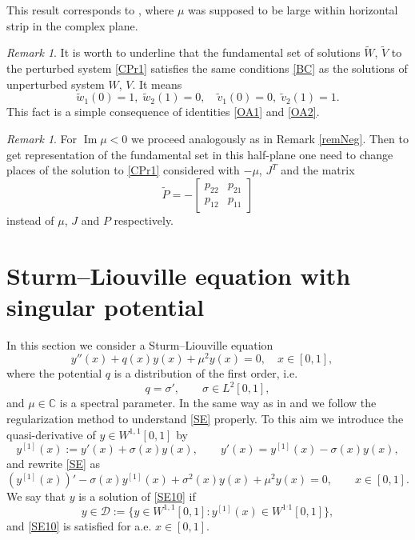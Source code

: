 \documentclass[11pt]{amsart}
\theoremstyle{plain}
\theoremstyle{definition}
\theoremstyle{remark}
\newtheorem{rem}[thm]{Remark}
\numberwithin{equation}{section}
\renewcommand\Im{\operatorname{Im}}
\begin{document}
This result corresponds to \cite[Theorem 3.2]{GRZ1}, where $\mu$ was supposed to be large
within horizontal strip in the complex plane.
\begin{rem}\label{remBC}
It is worth to underline that the fundamental set of solutions $\widetilde{W}$, $\widetilde{V}$ to
the perturbed system \eqref{CPr1} satisfies the same conditions \eqref{BC} as the solutions of
unperturbed system $W$, $V$. It means
\begin{equation}\label{BCt}
\tilde{w}_1(0)=1,\;\tilde{w}_2(1)=0,\quad \tilde{v}_1(0)=0,\;\tilde{v}_2(1)=1.
\end{equation}
This fact is a simple consequence of identities \eqref{OA1} and \eqref{OA2}.
\end{rem}
\begin{rem}\label{remPer}
For $\Im \mu <0$ we proceed analogously as in Remark \ref{remNeg}. Then to get representation of
the fundamental set in this half-plane one need to change places of the solution
to \eqref{CPr1} considered  with $-\mu$, $J^T$  and the matrix
$$\widetilde{P}=-\left[\begin{array}{cc} p_{22}&p_{21}\\ p_{12}& p_{11}\end{array}\right]$$
instead of $\mu$, $J$ and $P$ respectively.
\end{rem}



\section{Sturm--Liouville equation with singular potential}

In this section we consider a Sturm--Liouville equation
\begin{equation}\label{SE}
y''(x)+q(x)y(x)+\mu^2  y(x)=0,\quad x\in [0,1],\quad
\end{equation}
where the potential $q$ is a distribution
of the first order,  i.e.
\[
q=\sigma',\qquad \sigma\in L^2[0,1],
\]
and $\mu\in \mathbb{C}$ is a spectral parameter.
In the same way as in \cite{Atk} and \cite{SS} we follow the regularization method
to understand \eqref{SE} properly.
To this aim we introduce the quasi-derivative of $y\in W^{1,1}[0,1]$ by
\[
y^{[1]}(x):=y'(x)+\sigma(x)y(x),\qquad
y'(x)=y^{[1]}(x)-\sigma(x)y(x),
\]
and rewrite  \eqref{SE} as
\begin{equation}\label{SE10}
(y^{[1]}(x))'-\sigma(x)y^{[1]}(x)+\sigma^2(x)y(x)
+\mu^2 y(x)=0,\qquad x\in [0,1].
\end{equation}
We say that  $y$ is a solution of \eqref{SE10} if
\[
y\in \mathcal{D}:=\{y\in W^{1,1}[0,1]:
y^{[1]}(x)\in W^{1^,1}[0,1]\},
\]
and  \eqref{SE10} is satisfied  for a.e. $x\in [0,1]$.
\end{document}
